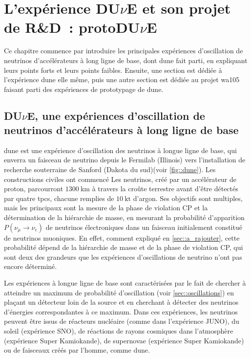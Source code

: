 \chapter{L'expérience \texorpdfstring{DU$\nu$E}{DUNE} et son projet de R\&D~: \texorpdfstring{protoDU$\nu$E}{protoDUNE}}
    
    Ce chapitre commence par introduire les principales expériences d'oscillation de neutrinos d'accélérateurs à long ligne de base, dont \gls{dune} fait parti, en expliquant leurs points forts et leurs points faibles. Ensuite, une section est dédiée à l'expérience \gls{dune} elle même, puis une autre section est dédiée au projet \gls{wa105} faisant parti des expériences de prototypage de \gls{dune}.
        
    \section{DU$\nu$E, une expériences d'oscillation de neutrinos d'accélérateurs à long ligne de base}
    
        \gls{dune} est une expérience d'oscillation des neutrinos à longue ligne de base, qui enverra un faisceau de neutrino depuis le Fermilab (Illinois) vers l'installation de recherche souterraine de Sanford (Dakota du sud)(voir \autoref{fig::dune}). Les constructions civiles ont commencé %
        Les neutrinos, créé par un accélérateur de proton, parcourront $\SI{1300}{\kilo\meter}$ à travers la croûte terrestre avant d'être détectés par quatre \glspl{tpc}, chacune remplies de $\SI{10}{\kilo\tonne}$ d'argon. Ses objectifs sont multiples, mais les principaux sont la mesure de la phase de violation CP et la détermination de la hiérarchie de masse, en mesurant la probabilité d'apparition $P(\nu_{\mu}\to\nu_e)$ de neutrinos électroniques dans un faisceau initialement constitué de neutrinos muoniques.  En effet, comment expliqué en \autoref{sec::a_rajouter}, cette probabilité dépend de la hiérarchie de masse et de la phase de violation CP, qui sont deux des grandeurs que les expériences d'oscillations de neutrino n'ont pas encore déterminé. 
        
        Les expériences à longue ligne de base sont caractérisées par le fait de chercher à atteindre un maximum de probabilité d'oscillation (voir \autoref{sec::oscillations}) en plaçant un détecteur loin de la source et en cherchant à détecter des neutrinos d'énergies correspondantes à ce maximum. Dans ces expériences, les neutrinos peuvent être issus de réacteurs nucléaire (comme dans l'expérience JUNO\cite{juno}), du soleil (expérience SNO\cite{sno}), de réactions de rayons cosmiques dans l'atmosphère (expérience Super Kamiokande\cite{skk_atm}), de supernovae (expérience Super Kamiokande\cite{skk_atm}) ou de faisceaux créés par l'homme, comme \gls{dune}.
        
